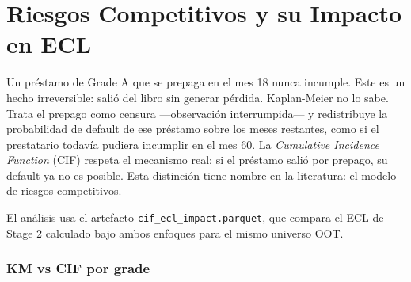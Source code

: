 \documentclass[
  spanish,
  11pt,
  letterpaper,
]{scrbook}
\theoremstyle{plain}
\theoremstyle{remark}
\begin{document}
\chapter{Riesgos Competitivos y su Impacto en
ECL}\label{sec-competing-risks}

Un préstamo de Grade A que se prepaga en el mes 18 nunca incumple. Este
es un hecho irreversible: salió del libro sin generar pérdida.
Kaplan-Meier no lo sabe. Trata el prepago como censura ---observación
interrumpida--- y redistribuye la probabilidad de default de ese
préstamo sobre los meses restantes, como si el prestatario todavía
pudiera incumplir en el mes 60. La \emph{Cumulative Incidence Function}
(CIF) respeta el mecanismo real: si el préstamo salió por prepago, su
default ya no es posible. Esta distinción tiene nombre en la literatura:
el modelo de riesgos competitivos.

El análisis usa el artefacto \texttt{cif\_ecl\_impact.parquet}, que
compara el ECL de Stage 2 calculado bajo ambos enfoques para el mismo
universo OOT.

\subsection{KM vs CIF por grade}\label{km-vs-cif-por-grade}
\end{document}
